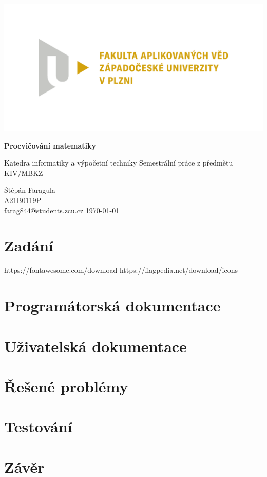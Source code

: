 \documentclass[12pt]{report}
\begin{document}
	\begin{titlepage}
		\centering
		\Large
		
		\includegraphics[width=.7\textwidth]{fav}
		
		\vspace{15mm}
		{\Huge\bfseries Procvičování matematiky}

		\vspace{5mm}
		{\LARGE Katedra informatiky a výpočetní techniky}
		{\LARGE Semestrální práce z předmětu KIV/MBKZ}
		
		\vfill
		\raggedright
		Štěpán Faragula\\
		A21B0119P\\
		farag844@students.zcu.cz
		\hfill 
		\today
	\end{titlepage}

	
	\tableofcontents


	\chapter{Zadání}		
	https://fontawesome.com/download
	https://flagpedia.net/download/icons

	\chapter{Programátorská dokumentace}


	\chapter{Uživatelská dokumentace}


	\chapter{Řešené problémy}


	\chapter{Testování}
	

	\chapter{Závěr}
	
\end{document}
